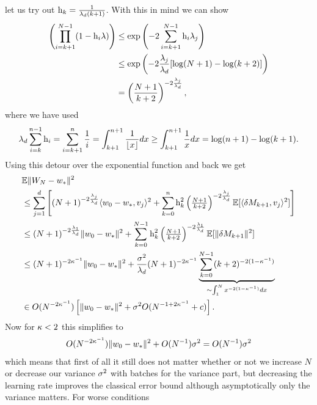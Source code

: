 let us try out \(\text{h}_k = \tfrac{1}{\lambda_d(k+1)}\). With this in
mind we can show
\begin{align*}
	\left(\prod_{i=k+1}^{N-1}(1-\text{h}_i\lambda)\right)
	&\le\exp\left(-2\sum_{i=k+1}^{N-1}\text{h}_i\lambda_j\right)\\
	&\le \exp\left(-2\frac{\lambda_j}{\lambda_d}[\log(N+1)-\log(k+2)]\right)\\
	&= \left(\frac{N+1}{k+2}\right)^{-2\frac{\lambda_j}{\lambda_d}},
\end{align*}
where we have used
\begin{align*}
	\lambda_d\sum_{i=k}^{n-1} \text{h}_i
	= \sum_{i=k+1}^n \frac{1}{i}
	= \int_{k+1}^{n+1} \frac{1}{\lfloor x\rfloor} dx
	\ge \int_{k+1}^{n+1} \frac{1}x dx
	= \log(n+1) - \log(k+1).
\end{align*}
Using this detour over the exponential function and back we get
\begin{align*}
	&\mathbb{E}\|W_N - w_*\|^2\\
	&\le \sum_{j=1}^d \Bigg[ (N+1)^{-2\frac{\lambda_j}{\lambda_d}}\langle w_0-w_*, v_j\rangle^2
	+ \sum_{k=0}^n \text{h}_k^2 \left(\tfrac{N+1}{k+2}\right)^{-2\frac{\lambda_j}{\lambda_d}}
	\mathbb{E}[\langle\delta M_{k+1},v_j\rangle^2]\Bigg]\\
	&\le (N+1)^{-2\frac{\lambda_1}{\lambda_d}}\|w_0-w_*\|^2
	+ \sum_{k=0}^{N-1} \text{h}_k^2 \left(\tfrac{N+1}{k+2}\right)^{-2\frac{\lambda_1}{\lambda_d}}
	\mathbb{E}[\|\delta M_{k+1}\|^2]\\
	&\le (N+1)^{-2\kappa^{-1}}\|w_0-w_*\|^2
	+ \frac{\sigma^2}{\lambda_d} (N+1)^{-2\kappa^{-1}}
	\underbrace{\sum_{k=0}^{N-1} (k+2)^{-2(1-\kappa^{-1})}}_{\sim \int_1^N x^{-2(1-\kappa^{-1})}dx}\\
	&\in O(N^{-2\kappa^{-1}})\left[\|w_0-w_*\|^2 + \sigma^2 O(N^{-1+2\kappa^{-1}} + c) \right].
\end{align*}
Now for \(\kappa<2\) this simplifies to 
\begin{align*}
	O(N^{-2\kappa^{-1}})\|w_0-w_*\|^2 + O(N^{-1})\sigma^2
	= O(N^{-1})\sigma^2
\end{align*}
which means that first of all it still does not matter whether or not we
increase \(N\) or decrease our variance \(\sigma^2\) with batches for the
variance part, but decreasing the learning rate improves the classical error
bound although asymptotically only the variance matters. For worse conditions
